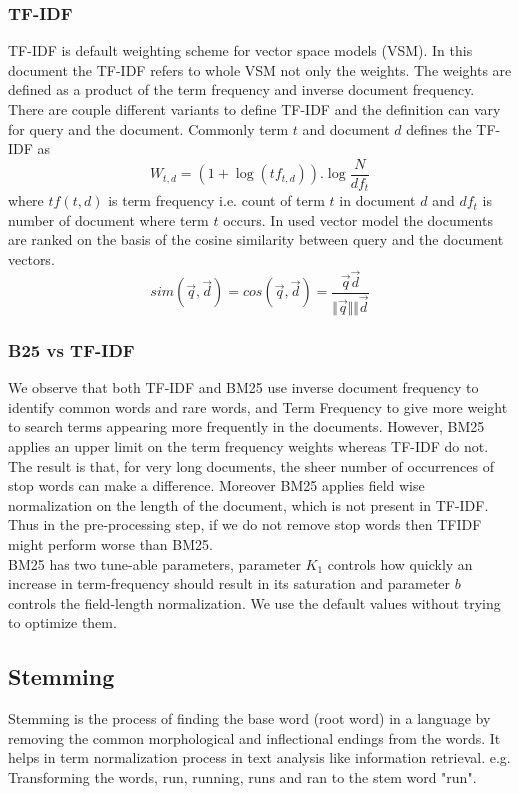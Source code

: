 \documentclass[report,draft*]{aaltoseries}
\begin{document}
\subsubsection{TF-IDF}
TF-IDF is default weighting scheme for vector space models (VSM). In this document the TF-IDF refers to whole VSM not only the weights. The weights are defined as a product of the term frequency and inverse document frequency. There are couple different variants to define TF-IDF and the definition can vary for query and the document. Commonly term $t$ and document $d$ defines the TF-IDF as \\
\begin{equation}
W_{t,d} = (1 + \log(tf_{t,d})). \log\frac{N}{df_t}
\end{equation}
where $tf(t,d)$ is term frequency i.e. count of term $t$ in document $d$ and $df_t$ is number of document where term $t$ occurs.
In used vector model the documents are ranked on the basis of the cosine similarity between query and the document vectors. \\
\begin{equation}
sim(\vec{q}, \vec{d}) = cos(\vec{q}, \vec{d}) = \frac{\vec{q}\dot{}\vec{d}}	{\Vert 	\vec{q} \Vert \Vert \vec{d}}
\end{equation}		
\subsubsection{B25 vs TF-IDF}
We observe that both TF-IDF and BM25 use inverse document frequency to identify common words and rare words, and Term Frequency to give more weight to search terms appearing more frequently in the documents. However, BM25 applies an upper limit on the term frequency weights whereas TF-IDF do not. The result is that, for very long documents, the sheer number of occurrences of stop words can make a difference. Moreover BM25 applies field wise normalization on the length of the document, which is not present in TF-IDF. Thus in the pre-processing step, if we do not remove stop words then TFIDF might perform worse than BM25. 
\\BM25 has two tune-able parameters, parameter $K_1$ controls how quickly an increase in term-frequency should result in its saturation and parameter $b$ controls the field-length normalization. We use the default values without trying to optimize them.

\subsection{Stemming}
Stemming is the process of finding the base word (root word) in a language by removing the common morphological and inflectional endings from the words. It helps in term normalization process in text analysis like information retrieval. e.g. Transforming the words, run, running, runs and ran to the stem word "run". 
\end{document}
